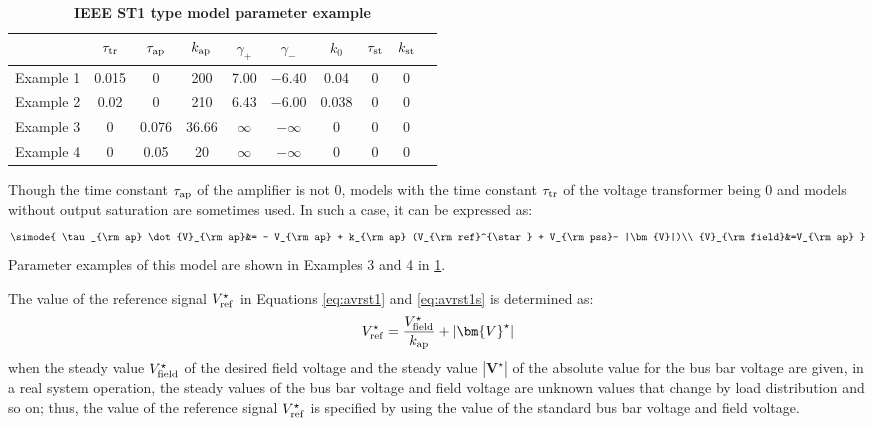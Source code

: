 \documentclass[tombow,dvipdfmx]{corona-a5-1.1}
\begin{document}
\begin{table}[h]
\medskip
 \caption{\textbf{IEEE ST1 type model parameter example}}
 \label{table:AVRparast1}
 \centering
  \begin{tabular}{lccccccccc}
   \hline
 &  $\tau_{\rm tr}$ & $\tau_{\rm ap}$ & $k_{\rm ap}$ & $\gamma_{+}$ & $\gamma_{-}$ & $k_{0}$ & $\tau_{\rm st}$ & $k_{\rm st}$\\
   \hline \hline
   Example 1 \cite[Section 8.6.3]{kundur1994power}& 0.015 & 0 & 200 & 7.00 & $-6.40$ & 0.04 & 0 & 0\\
   Example 2 \cite[Table H.23]{ieee2016ieee}& 0.02 & 0 & 210 & 6.43 & $-6.00$ & 0.038 & 0 & 0 \\
   Example 3 \cite[Section V]{chow2004power}& 0 & 0.076 & 36.66 & $\infty$ & $-\infty$ & 0 & 0 & 0 \\
   Example 4 \cite[Table 4]{sadamoto2019dynamic}& 0 & 0.05 & 20 & $\infty$ & $-\infty$ & 0 & 0 & 0 \\
   \hline
  \end{tabular}
\end{table}

Though the time constant $\tau_{\rm ap}$ of the amplifier is not 0, models with the time constant $\tau_{\rm tr}$ of the voltage transformer being 0 and models without output saturation are sometimes used.
In such a case, it can be expressed as:
\begin{align}\label{eq:avrst1s}
\simode{
\tau_{\rm ap} \dot{V}_{\rm ap}&=
- V_{\rm ap} + k_{\rm ap} (V_{\rm ref}^{\star} + V_{\rm pss}- |\bm{V}|)\\
{V}_{\rm field}&=V_{\rm ap}
}
\end{align}
Parameter examples of this model are shown in Examples 3 and 4 in \ref{table:AVRparast1}.

The value of the reference signal $V_{{\rm ref}}^{\star}$ in Equations \ref{eq:avrst1} and \ref{eq:avrst1s} is determined as:
\begin{align}\label{eq:avrref}
V_{{\rm ref}}^{\star} = \frac{V_{{\rm field}}^{\star}}{k_{{\rm ap}}}+|\bm{V}^{\star}|
\end{align}
when the steady value $V_{{\rm field}}^{\star}$ of the desired field voltage and the steady value $|\bm{V}^{\star}|$ of the absolute value for the bus bar voltage are given, in a real system operation, the steady values of the bus bar voltage and field voltage are unknown values that change by load distribution and so on;
thus, the value of the reference signal $V_{{\rm ref}}^{\star}$ is specified by using the value of the standard bus bar voltage and field voltage.
\end{document}
